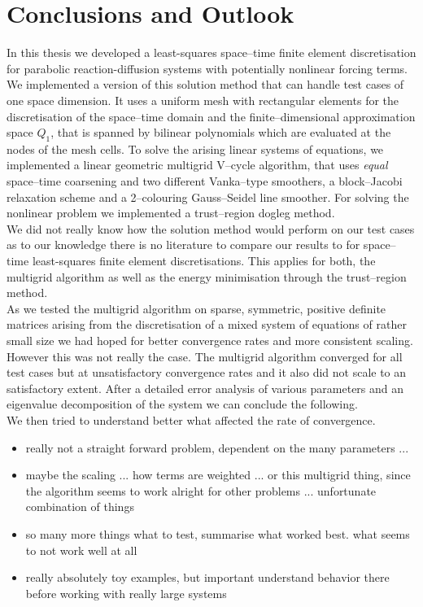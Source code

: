 \documentclass[../draft_1.tex]{subfiles}
\begin{document}
\chapter{Conclusions and Outlook}

In this thesis we developed a least-squares space--time finite element discretisation for parabolic reaction-diffusion systems with potentially nonlinear forcing terms. We implemented a version of this solution method that can handle test cases of one space dimension. It uses a uniform mesh with rectangular elements for the discretisation of the space--time domain and the finite--dimensional approximation space $Q_1$, that is spanned by bilinear polynomials which are evaluated at the nodes of the mesh cells. To solve the arising linear systems of equations, we implemented a linear geometric multigrid V--cycle algorithm, that uses \textit{equal} space--time coarsening and two different Vanka--type smoothers, a block--Jacobi relaxation scheme and a 2--colouring Gauss--Seidel line smoother. For solving the nonlinear problem we implemented a trust--region dogleg method. 
\smallskip
\\
We did not really know how the solution method would perform on our test cases as to our knowledge there is no literature to compare our results to for space--time least-squares finite element discretisations. This applies for both, the multigrid algorithm as well as the energy minimisation through the trust--region method. 
\smallskip 
\\
As we tested the multigrid algorithm on sparse, symmetric, positive definite matrices arising from the discretisation of a mixed system of equations of rather small size we had hoped for better convergence rates and more consistent scaling. However this was not really the case. The multigrid algorithm converged for all test cases but at unsatisfactory convergence rates and it also did not scale to an satisfactory extent. After a detailed error analysis of various parameters and an eigenvalue decomposition of the system we can conclude the following. 
\smallskip
\\
We then tried to understand better what affected the rate of convergence.  


\begin{itemize}
	\item really not a straight forward problem, dependent on the many parameters ... 
	\item maybe the scaling ... how terms are weighted ... or this multigrid thing, since the algorithm seems to work alright for other problems ... unfortunate combination of things
	\item so many more things what to test, summarise what worked best. what seems to not work well at all
	\item really absolutely toy examples, but important understand behavior there before working with really large systems
	
\end{itemize}
\end{document}
